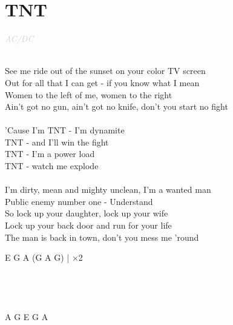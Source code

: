 \documentclass[a5paper, 10pt]{book}
\begin{document}
\section{TNT}\textcolor{lightgray}{\textit{AC/DC}}\\~\\
\begin{minipage}[t]{0.7\textwidth}
  See me ride out of the sunset on your color TV screen\\
  Out for all that I can get - if you know what I mean\\
  Women to the left of me, women to the right\\
  Ain't got no gun, ain't got no knife, don't you start no fight\\
  \\
  \hspace*{5mm}'Cause I'm TNT - I'm dynamite \\
  \hspace*{5mm}TNT - and I'll win the fight\\
  \hspace*{5mm}TNT - I'm a power load\\
  \hspace*{5mm}TNT - watch me explode\\
  \\
  I'm dirty, mean and mighty unclean, I'm a wanted man\\
  Public enemy number one - Understand\\
  So lock up your daughter, lock up your wife\\
  Lock up your back door and run for your life\\
  The man is back in town, don't you mess me 'round\\
\end{minipage}
\begin{minipage}[t]{0.3\textwidth}
  E G A (G A G) | $\times$2\\
  \\
  \\
  \\
  \\
  A G E G A
\end{minipage}

\newpage
\end{document}
